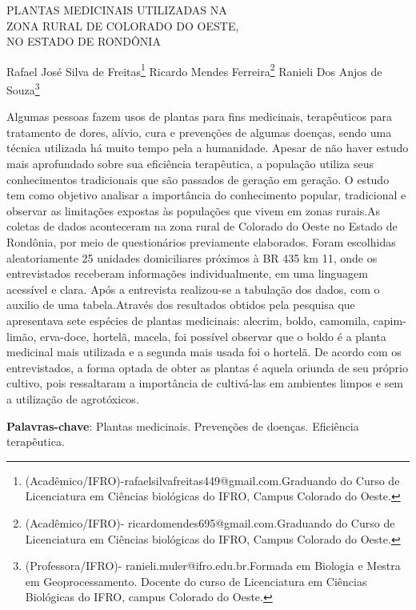 \documentclass[article,12pt,onesidea,4paper,english,brazil]{abntex2}
\begin{document}
	
	
	\frenchspacing 
	
	\begin{center}
		\LARGE PLANTAS MEDICINAIS UTILIZADAS NA\\ZONA RURAL DE COLORADO DO
		OESTE,\\NO ESTADO DE RONDÔNIA
		
		\normalsize
	Rafael José Silva de Freitas\footnote{(Acadêmico/IFRO)-rafaelsilvafreitas449@gmail.com.Graduando do Curso de Licenciatura em Ciências biológicas do IFRO, Campus Colorado do Oeste.} 
	Ricardo Mendes Ferreira\footnote{(Acadêmico/IFRO)- ricardomendes695@gmail.com.Graduando do Curso de Licenciatura em Ciências biológicas do IFRO, Campus Colorado do Oeste.} 
	Ranieli Dos Anjos de Souza\footnote{(Professora/IFRO)- ranieli.muler@ifro.edu.br.Formada em Biologia e Mestra em Geoprocessamento. Docente do curso de Licenciatura em Ciências Biológicas do IFRO, campus Colorado do Oeste.} 
	\end{center}
	
	\noindent Algumas pessoas fazem usos de plantas para fins medicinais,
	terapêuticos para tratamento de dores, alívio, cura e prevenções de algumas
	doenças, sendo uma técnica utilizada há muito tempo pela a humanidade. Apesar de
	não haver estudo mais aprofundado sobre sua eficiência terapêutica, a população
	utiliza seus conhecimentos tradicionais que são passados de geração em geração.
	O estudo tem como objetivo analisar a importância do conhecimento popular,
	tradicional e observar as limitações expostas às populações que vivem em zonas
	rurais.As coletas de dados aconteceram na zona rural de Colorado do
	Oeste no Estado de Rondônia, por meio de questionários previamente elaborados.
	Foram escolhidas aleatoriamente 25 unidades domiciliares próximos à BR 435 km
	11, onde os entrevistados receberam informações individualmente, em uma
	linguagem acessível e clara. Após a entrevista realizou-se a tabulação dos dados,
	com o auxilio de uma tabela.Através dos resultados obtidos pela
	pesquisa que apresentava sete espécies de plantas medicinais: alecrim, boldo,
	camomila, capim-limão, erva-doce, hortelã, macela, foi possível observar que o
	boldo é a planta medicinal mais utilizada e a segunda mais usada foi o hortelã. De
	acordo com os entrevistados, a forma optada de obter as plantas é aquela oriunda
	de seu próprio cultivo, pois ressaltaram a importância de cultivá-las em ambientes
	limpos e sem a utilização de agrotóxicos.
	
	
	\vspace{\onelineskip}
	
	\noindent
	\textbf{Palavras-chave}: Plantas medicinais. Prevenções de doenças. Eficiência terapêutica.
	
\end{document}
